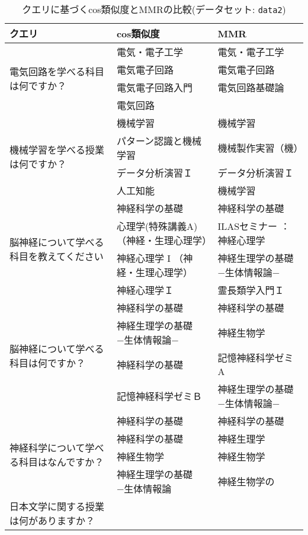 \begin{table}[htbp]
    \centering
    \caption{クエリに基づくcos類似度とMMRの比較(データセット: \texttt{data2})}
    \label{tab:query_similarity_mmr_data2}
    {\small
    \begin{tabular}{|p{2.5cm}|p{5.5cm}|p{5.5cm}|}
        \hline
        \textbf{クエリ} & \textbf{cos類似度} & \textbf{MMR} \\ \hline
        \multirow{4}{2.5cm}{電気回路を学べる科目は何ですか？} & 
        電気・電子工学 & 電気・電子工学 \\
        & 電気電子回路 & 電気電子回路 \\
        & 電気電子回路入門 & 電気回路基礎論 \\
        & 電気回路 & \\ \hline
        \multirow{4}{2.5cm}{機械学習を学べる授業は何ですか？} & 
        機械学習 & 機械学習 \\
        & パターン認識と機械学習 & 機械製作実習（機） \\
        & データ分析演習Ｉ & データ分析演習Ｉ \\
        & 人工知能 & 機械学習 \\ \hline
        \multirow{4}{2.5cm}{脳神経について学べる科目を教えてください} & 
        神経科学の基礎 & 神経科学の基礎 \\
        & 心理学(特殊講義A)（神経・生理心理学） & ILASセミナー ：神経心理学 \\
        & 神経心理学 I （神経・生理心理学） & 神経生理学の基礎 −生体情報論− \\
        & 神経心理学Ｉ & 霊長類学入門Ｉ \\ \hline
        \multirow{4}{2.5cm}{脳神経について学べる科目は何ですか？} & 
        神経科学の基礎 & 神経科学の基礎 \\
        & 神経生理学の基礎 −生体情報論− & 神経生物学 \\
        & 神経科学の基礎 & 記憶神経科学ゼミA \\
        & 記憶神経科学ゼミＢ & 神経生理学の基礎 −生体情報論− \\ \hline
        \multirow{4}{2.5cm}{神経科学について学べる科目はなんですか？} & 
        神経科学の基礎 & 神経科学の基礎 \\
        & 神経科学の基礎 & 神経生理学 \\
        & 神経生物学 & 神経生物学 \\
        & 神経生理学の基礎 −生体情報論 & 神経生物学の \\ \hline
        \multirow{4}{2.5cm}{日本文学に関する授業は何がありますか？} & 

\end{tabular}}
\end{table}
